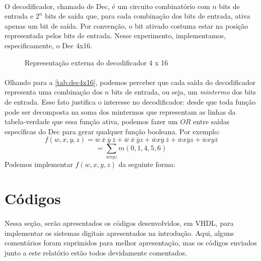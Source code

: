 \documentclass[a4paper,12pt]{article}
\begin{document}
\paragraph{}
O decodificador, chamado de Dec, é um circuito combinatório com $n$ bits de entrada e $2^n$ bits de saída que, para cada combinação dos bits de entrada, ativa apenas um bit de saída. Por convenção, o bit ativado costuma estar na posição representada pelos bits de entrada. Nesse experimento, implementamos, especificamente, o Dec 4x16.

\begin{figure}[H]
    \centering
    
    \caption{Representação externa do decodificador 4 x 16}
    \label{fig:dec4x16}
\end{figure}

\paragraph{}
Olhando para a \autoref{tab:dec4x16}, podemos perceber que cada saída do decodificador representa uma combinação dos $n$ bits de entrada, ou seja, um \textit{mintermo} dos bits de entrada. Esse fato justifica o interesse no decodificador: desde que toda função pode ser decomposta na soma dos mintermos que representam as linhas da tabela-verdade que essa função ativa, podemos fazer um $OR$ entre saídas específicas do Dec para gerar qualquer função booleana. Por exemplo:
\[
f(w, x, y, z) = \overline{w} \ \overline{x} \ \overline{y} \ \overline{z} + \overline{w} \ \overline{x} \ \overline{y} z + \overline{w} x \overline{y} \ \overline{z} + \overline{w}x \overline{y} z + \overline{w}xy\overline{z}
\]
\[
= \sum_{wxyz}m(0,1,4,5,6)
\]
Podemos implementar $f(w, x, y, z)$ da seguinte forma:

\begin{figure}[H]
    \centering
    
    \label{fig:enter-label}
\end{figure}


\section{Códigos}
\paragraph{}
Nessa seção, serão apresentados os códigos desenvolvidos, em VHDL, para implementar os sistemas digitais apresentados na introdução. Aqui, alguns comentários foram suprimidos para melhor apresentação, mas os códigos enviados junto a este relatório estão todos devidamente comentados.
\end{document}
